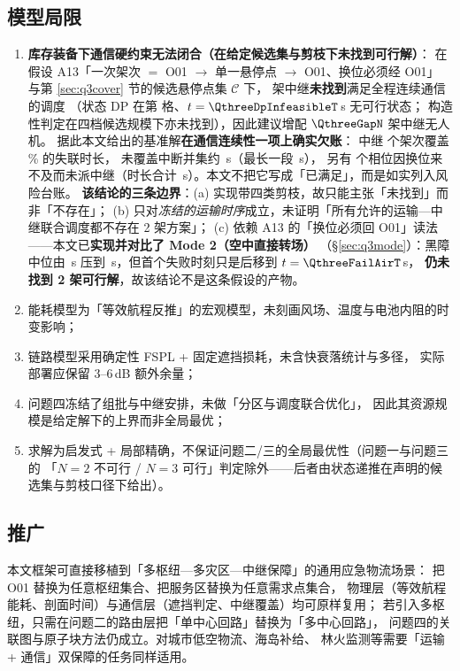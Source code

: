 \documentclass[12pt,a4paper,fontset=windows]{ctexart}
\begin{document}
\subsection{模型局限}\label{sec:limits}
\begin{enumerate}[leftmargin=2.2em,itemsep=2pt]
\item \textbf{库存装备下通信硬约束无法闭合（在给定候选集与剪枝下未找到可行解）}：
  在假设 A13「一次架次 $=$ O01 $\to$ 单一悬停点 $\to$ O01、换位必须经 O01」
  与第 \ref{sec:q3cover} 节的候选悬停点集 $\mathcal{C}$ 下，
  \RelayN{} 架中继\textbf{未找到}满足全程连续通信的调度
  （状态 DP 在第 \QthreeDpInfeasibleCell{} 格、$t=\QthreeDpInfeasibleT$\,s 无可行状态；
  构造性判定在四档候选规模下亦未找到），因此建议增配 $\QthreeGapN$ 架中继无人机。
  据此本文给出的基准解\textbf{在通信连续性一项上确实欠账}：
  中继 \QthreeCompromiseSorties{} 个架次覆盖 \QthreeCompromiseCoverPct\% 的失联时长，
  未覆盖中断并集约 \QthreeCompromiseUncoveredS\,s（最长一段 \QthreeCompromiseLongestS\,s），
  另有 \QthreeCompromiseOutagePhaseN{} 个相位因换位来不及而未派中继（时长合计
  \QthreeCompromiseOutagePhaseS\,s）。本文不把它写成「已满足」，而是如实列入风险台账。
  \textbf{该结论的三条边界}：(a) 实现带四类剪枝，故只能主张「未找到」而非「不存在」；
  (b) 只对\emph{冻结的运输时序}成立，未证明「所有允许的运输—中继联合调度都不存在 2 架方案」；
  (c) 依赖 A13 的「换位必须回 O01」读法——本文已\textbf{实现并对比了 Mode 2（空中直接转场）}
  （\S\ref{sec:q3mode}）：黑障中位由 \QthreeDpBlackoutMedianS\,s 压到
  \QthreeDpBlackoutAirMedianS\,s，但首个失败时刻只是后移到 $t=\QthreeFailAirT$\,s，
  \textbf{仍未找到 2 架可行解}，故该结论不是这条假设的产物。
\item 能耗模型为「等效航程反推」的宏观模型，未刻画风场、温度与电池内阻的时变影响；
\item 链路模型采用确定性 FSPL + 固定遮挡损耗，未含快衰落统计与多径，
  实际部署应保留 3--6\,dB 额外余量；
\item 问题四冻结了组批与中继安排，未做「分区与调度联合优化」，
  因此其资源规模是给定解下的上界而非全局最优；
\item 求解为启发式 + 局部精确，不保证问题二/三的全局最优性（问题一与问题三的
  「$N=2$ 不可行 / $N=3$ 可行」判定除外——后者由状态递推在声明的候选集与剪枝口径下给出）。
\end{enumerate}

\subsection{推广}
本文框架可直接移植到「多枢纽—多灾区—中继保障」的通用应急物流场景：
把 O01 替换为任意枢纽集合、把服务区替换为任意需求点集合，
物理层（等效航程能耗、剖面时间）与通信层（遮挡判定、中继覆盖）均可原样复用；
若引入多枢纽，只需在问题二的路由层把「单中心回路」替换为「多中心回路」，
问题四的关联图与原子块方法仍成立。对城市低空物流、海岛补给、
林火监测等需要「运输 + 通信」双保障的任务同样适用。
\end{document}
